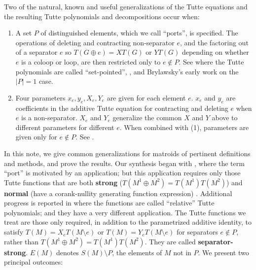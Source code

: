 \documentclass[12pt,leqno]{amsart}
\theoremstyle{remark}
\begin{document}
Two of the natural, known and useful generalizations
of the Tutte equations and the resulting
Tutte polynomials and decompositions occur when:
\begin{enumerate}
\item A set $P$ of distinguished elements, which
we call ``ports'', is specified.  The
operations of deleting and contracting 
non-separator $e$,
and the factoring out of a separator $e$
so $T(G\oplus e)=XT(G)$ or $YT(G)$ depending
on whether $e$ is a coloop or loop, are then
restricted only to $e\not\in P$.  See \cite{SetPointedLV,MR0419272}
where the Tutte polynomials are called ``set-pointed'',
\cite{sdcPorted}, and Brylawsky's early work 
\cite{BrylawskiPointed} on the $|P|=1$ case.
\item
Four parameters $x_e, y_e, X_e, Y_e$ are 
given for each element $e$.  $x_e$ and $y_e$
are coefficients in the additive Tutte 
equation for contracting and deleting
$e$ when $e$ is a non-separator.  $X_e$
and $Y_e$ generalize the common $X$ and $Y$
above to different parameters for
different $e$.  When combined with (1), 
parameters are given only for $e\not\in P$.
See \cite{MR93a:05047,BollobasRiordanTuttePolyColored,Ellis-Monaghan-Traldi}.
\end{enumerate}
In this note, we give common generalizations
for matroids of pertinent definitions and methods,
and prove the results.
Our synthesis began with
\cite{TutteEx}, where the term ``port'' is
motivated by an application;
but this application requires only those Tutte 
functions that are both {\bf strong} 
($T(M^1\oplus M^2)=T(M^1)T(M^2)$) and {\bf normal}
(have a corank-nullity generating function expression)
\cite{MR93a:05047}.  Additional progress is reported
in \cite{RelTuttePoly} where the functions
are called ``relative'' Tutte polynomials; and 
they have a very different application.
The Tutte functions we treat are those only required,
in addition to the parametrized additive identity,
to satisfy $T(M)=X_eT(M\setminus e)$ or
$T(M)=Y_eT(M\setminus e)$ for separators $e\not\in P$,
rather than $T(M^1\oplus M^2)=T(M^1)T(M^2)$.  
They are called {\bf separator-strong}\cite{JoAndTom}.
$E(M)$ denotes $S(M)\setminus P$, the
elements of $M$ not in $P$.
We present
two principal outcomes:
\end{document}

